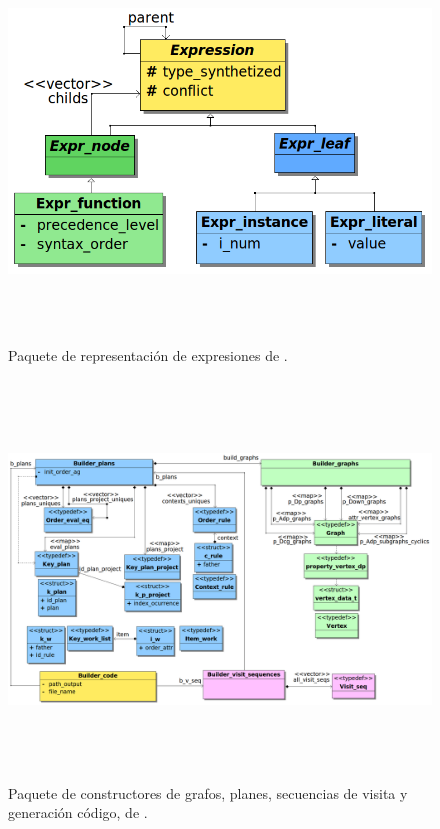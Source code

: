 \begin{figure}[!ht]\centering
\includegraphics[width=479pt, height=300pt, angle=90]{diagramas/Expression2.png}
\caption{\label{fig:dia-express}Paquete de representación de expresiones de \maggen.}
\end{figure}

\begin{figure}[!ht]\centering
\includegraphics[width=505pt, height=300pt, angle=90]{diagramas/Builder.png}
\caption{\label{fig:dia-builders}Paquete de constructores de grafos, planes, secuencias de visita y generación código, de \maggen.}
\end{figure}

